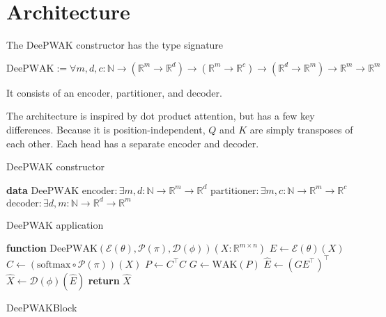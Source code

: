 \documentclass{article}
\begin{document}
\section{Architecture}

The DeePWAK constructor has the type signature

\begin{equation}
  \mathrm{DeePWAK} := \forall m,d,c :\mathbb{N} \to (\mathbb{R}^m \to \mathbb{R}^d) \to (\mathbb{R}^m \to \mathbb{R}^c) \to (\mathbb{R}^d \to \mathbb{R}^m) \to \mathbb{R}^m \to \mathbb{R}^m
\end{equation}

It consists of an encoder, partitioner, and decoder.

The architecture is inspired by dot product attention, but has a few key differences. Because it is position-independent, $Q$ and $K$ are simply transposes of each other. Each head has a separate encoder and decoder. 

\begin{algorithm}
  \caption{DeePWAK constructor}\label{alg:cap}
  \begin{algorithmic}[1]
    \State \textbf{data} $\mathrm{DeePWAK}${
    \State $\mathrm{encoder} : \exists m,d : \mathbb{N} \to \mathbb{R}^m \to \mathbb{R}^d$
    \State $\mathrm{partitioner} : \exists m,c : \mathbb{N} \to \mathbb{R}^m \to \mathbb{R}^c$
    \State $\mathrm{decoder} : \exists d,m : \mathbb{N} \to \mathbb{R}^d \to \mathbb{R}^m$
    }
  \end{algorithmic}
\end{algorithm}

\begin{algorithm}
  \caption{DeePWAK application}\label{alg:cap}
  \begin{algorithmic}[1]
    \State \textbf{function} $\mathrm{DeePWAK}(\mathcal{E}(\theta), \mathcal{P}(\pi), \mathcal{D}(\phi))(X : \mathbb{R}^{m \times n})${
    \State $E \gets \mathcal{E}(\theta)(X)$
    \State $C \gets (\mathrm{softmax} \circ \mathcal{P}(\pi))(X)$
    \State $P \gets C^\top C$
    \State $G \gets \mathrm{WAK}(P)$
    \State $\hat{E} \gets (GE^\top)^\top$
    \State $\hat{X} \gets \mathcal{D}(\phi)(\hat{E})$
    \State \textbf{return} $\hat{X}$
    }
  \end{algorithmic}
\end{algorithm}

\begin{algorithm}
  \caption{DeePWAKBlock}
\end{algorithm}
  
\end{document}
